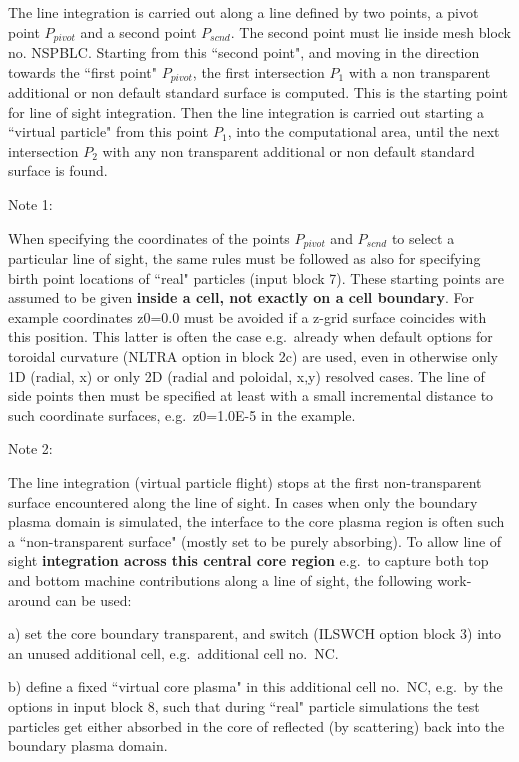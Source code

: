 The line integration is carried out along a line defined by two points, a pivot
point $P_{pivot}$ and a second point $P_{scnd}$.
The second point must lie inside mesh block no.
NSPBLC.
Starting from this ``second point", and moving in the direction towards the
``first point"	    $P_{pivot}$, the first intersection $P_1$ with a non
transparent additional or non default standard surface is computed.
This is the starting point for line of sight integration.
Then the line integration is carried out starting a ``virtual particle" from
this point $P_1$, into the computational area, until the next intersection
$P_2$ with any non transparent additional or non default standard surface is
found.

\medskip

Note 1:

When specifying the coordinates of the points $P_{pivot}$ and $P_{scnd}$ to
select a particular line of sight, the same rules must be followed as also for
specifying birth point locations of ``real" particles (input block 7).
These starting points are assumed to be given \textbf{inside a cell, not
exactly on a cell boundary}.
For example coordinates z0=0.0 must be avoided if a z-grid surface coincides
with this position.
This latter is often the case e.g.\ already when default options for toroidal
curvature (NLTRA option in block 2c) are used, even in otherwise only 1D
(radial, x) or only 2D (radial and poloidal, x,y) resolved cases.
The line of side points then must be specified at least with a small
incremental distance to such coordinate surfaces, e.g.\ z0=1.0E-5 in the
example.

Note 2:

The line integration (virtual particle flight) stops at the first
non-transparent surface encountered along the line of sight.
In cases when only the boundary plasma domain is simulated, the interface to
the core plasma region is often such a ``non-transparent surface" (mostly set
to be purely absorbing).
To allow line of sight \textbf{integration across this central core region}
e.g.\ to capture both  top and bottom machine contributions along a line of
sight, the following work-around can be used:

a) set the core boundary transparent, and switch (ILSWCH option block 3) into
an unused additional cell,
e.g.\ additional cell no.\ NC.

b) define a fixed ``virtual core plasma" in this additional cell no.\ NC, e.g.\
by the options in input block 8,
such that during ``real" particle simulations the test particles get either
absorbed in the core of reflected (by scattering)
back into the boundary plasma domain.

